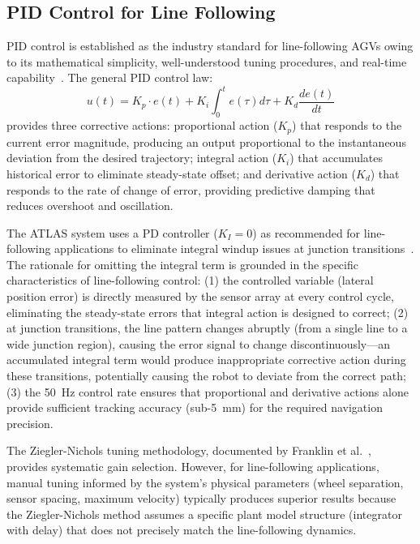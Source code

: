 \documentclass[12pt,a4paper,oneside]{report}
\begin{document}
\subsection{PID Control for Line Following}

PID control is established as the industry standard for line-following AGVs owing to its mathematical simplicity, well-understood tuning procedures, and real-time capability~\cite{ogata2010}. The general PID control law:
\begin{equation}
u(t) = K_p \cdot e(t) + K_i \int_0^t e(\tau) d\tau + K_d \frac{de(t)}{dt}
\end{equation}
provides three corrective actions: proportional action ($K_p$) that responds to the current error magnitude, producing an output proportional to the instantaneous deviation from the desired trajectory; integral action ($K_i$) that accumulates historical error to eliminate steady-state offset; and derivative action ($K_d$) that responds to the rate of change of error, providing predictive damping that reduces overshoot and oscillation.

The ATLAS system uses a PD controller ($K_I = 0$) as recommended for line-following applications to eliminate integral windup issues at junction transitions~\cite{ogata2010}. The rationale for omitting the integral term is grounded in the specific characteristics of line-following control: (1) the controlled variable (lateral position error) is directly measured by the sensor array at every control cycle, eliminating the steady-state errors that integral action is designed to correct; (2) at junction transitions, the line pattern changes abruptly (from a single line to a wide junction region), causing the error signal to change discontinuously---an accumulated integral term would produce inappropriate corrective action during these transitions, potentially causing the robot to deviate from the correct path; (3) the 50~Hz control rate ensures that proportional and derivative actions alone provide sufficient tracking accuracy (sub-5~mm) for the required navigation precision.

The Ziegler-Nichols tuning methodology, documented by Franklin et al.~\cite{franklin2015}, provides systematic gain selection. However, for line-following applications, manual tuning informed by the system's physical parameters (wheel separation, sensor spacing, maximum velocity) typically produces superior results because the Ziegler-Nichols method assumes a specific plant model structure (integrator with delay) that does not precisely match the line-following dynamics.
\end{document}

